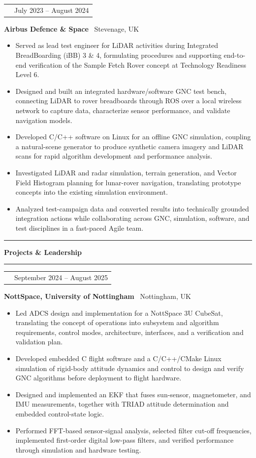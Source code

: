 \documentclass[10pt,a4paper]{article}
\makeatletter
\newcommand{\SectionSize}{11.5pt}
\newcommand{\RoleSize}{10.3pt}
\newcommand{\CompanySize}{9.6pt}
\newcommand{\DurationSize}{9pt}
\newcommand{\BodySize}{9.2pt}
\newcommand{\SectionLineSize}{12pt}
\newcommand{\RoleLineSize}{11.5pt}
\newcommand{\CompanyLineSize}{10.8pt}
\newcommand{\DurationLineSize}{9pt}
\newcommand{\BodyLineSize}{11pt}
\newcommand{\SectionBefore}{4pt}
\newcommand{\SectionLineToTitle}{0pt}
\newcommand{\SectionTitleToLine}{2pt}
\newcommand{\SectionLineToEntry}{0pt}
\newcommand{\EntryBefore}{0pt}
\newcommand{\RoleToCompany}{-5pt}
\newcommand{\CompanyToBullets}{3pt}
\newcommand{\EntryAfter}{6pt}
\newcommand{\BulletSpacing}{2pt}
\newcommand{\BulletBefore}{0pt}
\newcommand{\BulletIndent}{1.25em}
\newcommand{\SectionLineThickness}{1.5pt}
\newcommand{\SubsectionLineThickness}{0.4pt}
\newcommand{\DurationWidth}{4.5cm}
\newcommand{\CVSection}[1]{

    \vspace{\SectionBefore}


    \noindent
    \textcolor{CVBlack}{
        \rule{\textwidth}{\SectionLineThickness}
    }

    \vspace{\SectionLineToTitle}


    {\fontsize{\SectionSize}{\SectionLineSize}
    \selectfont
    \textbf{\textcolor{CVBlack}{#1}}}

    \vspace{\SectionTitleToLine}


    \noindent
    \textcolor{CVLightGray}{
        \rule{\textwidth}{\SubsectionLineThickness}
    }

    \vspace{\SectionLineToEntry}
}
\newcommand{\CVEntry}[5]{

    \vspace{\EntryBefore}


    \noindent
    \begin{tabularx}{\textwidth}{
        @{}
        >{\raggedright\arraybackslash}X
        >{\raggedleft\arraybackslash}p{\DurationWidth}
        @{}
    }

        {\fontsize{\RoleSize}{\RoleLineSize}
        \selectfont
        \textbf{\textcolor{CVBlack}{#1}}}
        &
        {\fontsize{\DurationSize}{\DurationLineSize}
        \selectfont
        \textcolor{CVGray}{#4}}

    \end{tabularx}

    \vspace{\RoleToCompany}


    \noindent
    {\fontsize{\CompanySize}{\CompanyLineSize}
    \selectfont
    \textbf{\textcolor{CVDarkGray}{#2}}
    \textcolor{CVGray}{\textbar\ #3}}

    \vspace{\CompanyToBullets}


    \begin{itemize}[
        leftmargin=\BulletIndent,
        itemsep=\BulletSpacing,
        topsep=\BulletBefore,
        parsep=0pt,
        partopsep=0pt
    ]
        #5
    \end{itemize}

    \vspace{\EntryAfter}
}
\newcommand{\CVBullet}[1]{
    \item
    {\fontsize{\BodySize}{\BodyLineSize}
    \selectfont
    \textcolor{CVDarkGray}{#1}}
}
\makeatother
\begin{document}
\CVEntry
{AOCS/GNC Engineer Intern}
{Airbus Defence \& Space}
{Stevenage, UK}
{July 2023 -- August 2024}
{
    \CVBullet{Served as lead test engineer for LiDAR activities during Integrated BreadBoarding (iBB) 3 \& 4, formulating procedures and supporting end-to-end verification of the Sample Fetch Rover concept at Technology Readiness Level 6.}

    \CVBullet{Designed and built an integrated hardware/software GNC test bench, connecting LiDAR to rover breadboards through ROS over a local wireless network to capture data, characterize sensor performance, and validate navigation models.}

    \CVBullet{Developed C/C++ software on Linux for an offline GNC simulation, coupling a natural-scene generator to produce synthetic camera imagery and LiDAR scans for rapid algorithm development and performance analysis.}

    \CVBullet{Investigated LiDAR and radar simulation, terrain generation, and Vector Field Histogram planning for lunar-rover navigation, translating prototype concepts into the existing simulation environment.}

    \CVBullet{Analyzed test-campaign data and converted results into technically grounded integration actions while collaborating across GNC, simulation, software, and test disciplines in a fast-paced Agile team.}
}


\CVSection{Projects \& Leadership}

\CVEntry
{JamSail 3U CubeSat -- AOCS/ADCS Lead}
{NottSpace, University of Nottingham}
{Nottingham, UK}
{September 2024 -- August 2025}
{
    \CVBullet{Led ADCS design and implementation for a NottSpace 3U CubeSat, translating the concept of operations into subsystem and algorithm requirements, control modes, architecture, interfaces, and a verification and validation plan.}

    \CVBullet{Developed embedded C flight software and a C/C++/CMake Linux simulation of rigid-body attitude dynamics and control to design and verify GNC algorithms before deployment to flight hardware.}

    \CVBullet{Designed and implemented an EKF that fuses sun-sensor, magnetometer, and IMU measurements, together with TRIAD attitude determination and embedded control-state logic.}

    \CVBullet{Performed FFT-based sensor-signal analysis, selected filter cut-off frequencies, implemented first-order digital low-pass filters, and verified performance through simulation and hardware testing.}
}
\end{document}
